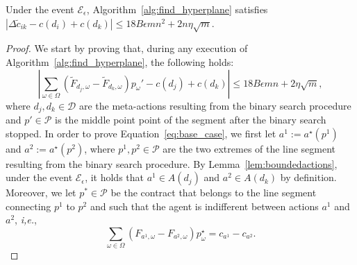 \begin{lemma}\label{lem:cost_hyperplane}
	Under the event $\mathcal{E}_\epsilon$, Algorithm~\ref{alg:find_hyperplane} satisfies $ | \Delta \widetilde{c}_{ik}   - {c}(d_i) + {c}(d_k) | \le 18 B \epsilon m n^2 + 2  n \eta \sqrt{m}$.
\end{lemma}
\begin{proof}
	We start by proving that, during any execution of Algorithm~\ref{alg:find_hyperplane}, the following holds:
	\begin{equation}\label{eq:base_case}
		\left| \sum_{\omega \in \Omega} \left(  \widetilde{F}_{d_{j},\omega} -  \widetilde{F}_{d_{k},\omega} \right) p_{\omega}'    - c(d_j) + c(d_k) \right| \leq 18 B \epsilon m n + 2 \eta \sqrt{m},
	\end{equation}
	where $d_j, d_k \in \mathcal{D}$ are the meta-actions resulting from the binary search procedure and $p' \in \mathcal{P}$ is the middle point point of the segment after the binary search stopped.
	In order to prove Equation~\eqref{eq:base_case}, we first let $a^1 := a^\star(p^1)$ and $a^2 := a^\star(p^2)$, where $p^1, p^2 \in \mathcal{P}$ are the two extremes of the line segment resulting from the binary search procedure.
	By Lemma~\ref{lem:boundedactions}, under the event $\mathcal{E}_\epsilon$, it holds that $a^1 \in A(d_j)$ and $a^2 \in A(d_k)$ by definition.
	Moreover, we let $p^* \in \mathcal{P}$ be the contract that belongs to the line segment connecting $p^1$ to $p^2$ and such that the agent is indifferent between actions $a^1$ and $a^2$, \emph{i,e.}, \[\sum_{\omega \in \Omega} \left(  F_{a^1,\omega} - F_{a^2,\omega}  \right) p^\star_\omega = c_{a^1} - c_{a^2} .\]


\end{proof}
